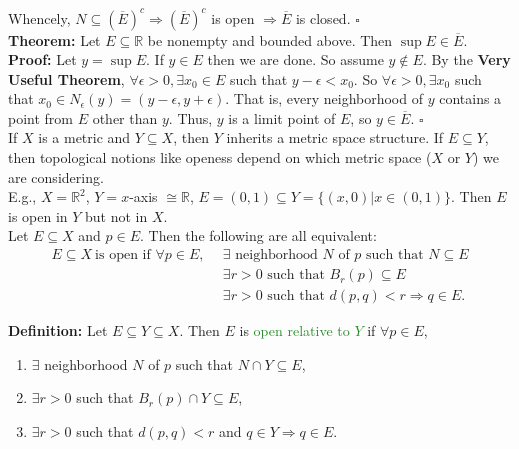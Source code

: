 \documentclass{article}
\begin{document}
Whencely, $N \subseteq (\overline{E})^c \Longrightarrow (\overline{E})^c$ is open $\Longrightarrow \overline{E}$ is closed. $\square$\\

\textbf{Theorem:} Let $E \subseteq \mathbb{R}$ be nonempty and bounded above. Then $\sup{E} \in \overline{E}$.\\
\textbf{Proof:} Let $y = \sup{E}$. If $y \in E$ then we are done. So assume $y \notin E$. By the \textbf{Very Useful Theorem}, $\forall \epsilon > 0, \exists x_0 \in E$ such that $y - \epsilon < x_0$. So $\forall \epsilon > 0, \exists x_0$ such that $x_0 \in N_{\epsilon}(y) = (y - \epsilon, y + \epsilon).$ That is, every neighborhood of $y$ contains a point from $E$ other than $y$. Thus, $y$ is a limit point of $E$, so $y \in \overline{E}$. $\square$ \\

If $X$ is a metric and $Y \subseteq X$, then $Y$ inherits a metric space structure. If $E \subseteq Y$, then topological notions like openess depend on which metric space ($X$ or $Y$) we are considering. \\

E.g., $X = \mathbb{R}^2$, $Y = x$-axis $\cong \mathbb{R}$, $E = (0,1) \subseteq Y = \{(x,0) \big| x \in (0,1)\}$. Then $E$ is open in $Y$ but not in $X$. \\

Let $E \subseteq X$ and $p \in E$. Then the following are all equivalent: 
\begin{align*}
    E \subseteq X \ \text{is open if } \forall p \in E,  \ \ &\exists \text{ neighborhood } N \text{ of } p \text{ such that } N \subseteq E \\
    &\exists r>0 \text{ such that } B_r(p) \subseteq E \\
    &\exists r>0 \text{ such that } d(p,q) < r \Longrightarrow q \in E.
\end{align*}

\textbf{Definition:} Let $E \subseteq Y \subseteq X$. Then $E$ is \textcolor{ForestGreen}{open relative to $Y$} if $\forall p \in E$, 
\begin{enumerate}
    \item $\exists$ neighborhood $N$ of $p$ such that $N \cap Y \subseteq E$,
    \item $\exists r>0$ such that $B_r(p) \cap Y \subseteq E$,
    \item $\exists r > 0$ such that $d(p,q)<r$ and $q \in Y \Longrightarrow q \in E$. 
\end{enumerate}
\end{document}
